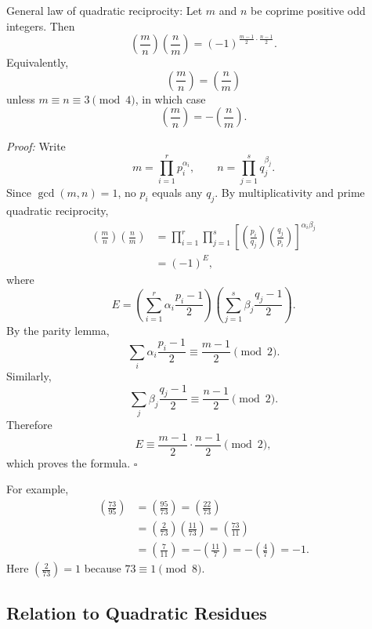 \documentclass[a4paper,11pt,abstracton]{scrartcl}
\theoremstyle{dotlessP}
\theoremstyle{dotlessS}
\theoremstyle{remark}
\theoremstyle{definition}
\begin{document}
\begin{mainbox}{General law of quadratic reciprocity:}
Let $m$ and $n$ be coprime positive odd integers. Then
\[
    \left(\frac mn\right)\left(\frac nm\right)
      =(-1)^{\frac{m-1}{2}\cdot\frac{n-1}{2}}.
\]
Equivalently,
\[
    \left(\frac mn\right)=\left(\frac nm\right)
\]
unless $m\equiv n\equiv3\pmod4$, in which case
\[
    \left(\frac mn\right)=-\left(\frac nm\right).
\]
\end{mainbox}

\begin{claim_box}
\textit{Proof:}
Write
\[
    m=\prod_{i=1}^{r}p_i^{\alpha_i},
    \qquad
    n=\prod_{j=1}^{s}q_j^{\beta_j}.
\]
Since $\gcd(m,n)=1$, no $p_i$ equals any $q_j$. By multiplicativity
and prime quadratic reciprocity,
\begin{align*}
    \left(\frac mn\right)\left(\frac nm\right)
      &=\prod_{i=1}^{r}\prod_{j=1}^{s}
        \left[
          \left(\frac{p_i}{q_j}\right)
          \left(\frac{q_j}{p_i}\right)
        \right]^{\alpha_i\beta_j}\\
      &=(-1)^E,
\end{align*}
where
\[
    E=\left(\sum_{i=1}^{r}
       \alpha_i\frac{p_i-1}{2}\right)
      \left(\sum_{j=1}^{s}
       \beta_j\frac{q_j-1}{2}\right).
\]
By the parity lemma,
\[
    \sum_i\alpha_i\frac{p_i-1}{2}
      \equiv\frac{m-1}{2}\pmod2.
\]
Similarly,
\[
    \sum_j\beta_j\frac{q_j-1}{2}
      \equiv\frac{n-1}{2}\pmod2.
\]
Therefore
\[
    E\equiv\frac{m-1}{2}\cdot\frac{n-1}{2}\pmod2,
\]
which proves the formula.
\hfill$\square$
\end{claim_box}

\begin{example_box}
For example,
\begin{align*}
    \left(\frac{73}{95}\right)
      &=\left(\frac{95}{73}\right)
       =\left(\frac{22}{73}\right)\\
      &=\left(\frac2{73}\right)
        \left(\frac{11}{73}\right)
       =\left(\frac{73}{11}\right)\\
      &=\left(\frac7{11}\right)
       =-\left(\frac{11}{7}\right)
       =-\left(\frac47\right)=-1.
\end{align*}
Here $\left(\frac2{73}\right)=1$ because $73\equiv1\pmod8$.
\end{example_box}

\subsection{Relation to Quadratic Residues}
\end{document}
